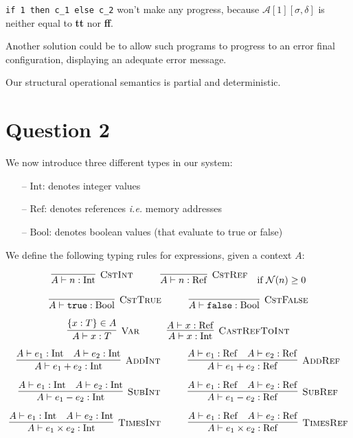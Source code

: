 \documentclass{article}
\newcommand{\Aa}[2]{\mathcal{A}\left[#1\right]\left[#2\right]}
\newcommand{\N}{\mathcal{N}}
\newcommand{\Rule}[3]{\infer[\textsc{#1}]{#2}{#3}}
\newcommand{\Ref}{\mathrm{Ref}}
\newcommand{\Int}{\mathrm{Int}}
\newcommand{\Bool}{\mathrm{Bool}}
\newcommand{\ie}{\emph{i.e.}}
\begin{document}
\texttt{if 1 then c\_1 else c\_2} won't make any progress, because $\Aa{1}{\sigma,\delta}$ is neither equal to \textbf{tt} nor \textbf{ff}.

Another solution could be to allow such programs to progress to an error final configuration, displaying an adequate error message.

Our structural operational semantics is partial and deterministic.

\section*{Question 2}

We now introduce three different types in our system:

\begin{itemize}
	\itemsep0em
	\item[--] $\Int{}$: denotes integer values
	\item[--] $\Ref{}$: denotes references \ie{} memory addresses
	\item[--] $\Bool{}$: denotes boolean values (that evaluate to true or false)
\end{itemize}

We define the following typing rules for expressions, given a context $A$:

\[
\Rule{CstInt}{A \vdash n: \Int}{}
\hspace*{1cm}
\Rule{CstRef}{A \vdash n: \Ref}{} \quad \text{if $\N(n) \geq 0$}
\]

\[
\Rule{CstTrue}{A \vdash \texttt{true}: \Bool}{}
\hspace*{1cm}
\Rule{CstFalse}{A \vdash \texttt{false}: \Bool}{}
\]

\[
\Rule{Var}{A \vdash x: T}{\lbrace x: T \rbrace \in A}
\hspace*{1cm}
\Rule{CastRefToInt}{A \vdash x: \Int}{A \vdash x: \Ref}
\]

\[
\Rule{AddInt}{A \vdash e_1 + e_2: \Int}{A \vdash e_1: \Int \quad A \vdash e_2: \Int}
\hspace*{1cm}
\Rule{AddRef}{A \vdash e_1 + e_2: \Ref}{A \vdash e_1: \Ref \quad A \vdash e_2: \Ref}
\]

\[
\Rule{SubInt}{A \vdash e_1 - e_2: \Int}{A \vdash e_1: \Int \quad A \vdash e_2: \Int}
\hspace*{1cm}
\Rule{SubRef}{A \vdash e_1 - e_2: \Ref}{A \vdash e_1: \Ref \quad A \vdash e_2: \Ref}
\]

\[
\Rule{TimesInt}{A \vdash e_1 \times e_2: \Int}{A \vdash e_1: \Int \quad A \vdash e_2: \Int}
\hspace*{1cm}
\Rule{TimesRef}{A \vdash e_1 \times e_2: \Ref}{A \vdash e_1: \Ref \quad A \vdash e_2: \Ref}
\]
\end{document}
